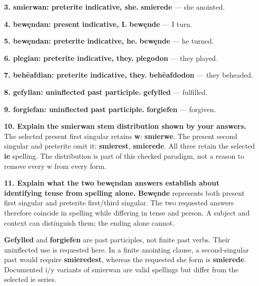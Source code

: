 \textbf{3. smierwan: preterite indicative, she.} \textbf{smierede} — she anointed.

\textbf{4. bewęndan: present indicative, I.} \textbf{bewęnde} — I turn.

\textbf{5. bewęndan: preterite indicative, he.} \textbf{bewęnde} — he turned.

\textbf{6. plegian: preterite indicative, they.} \textbf{plegodon} — they played.

\textbf{7. behēafdian: preterite indicative, they.} \textbf{behēafdodon} — they beheaded.

\textbf{8. gefyllan: uninflected past participle.} \textbf{gefylled} — fulfilled.

\textbf{9. forgiefan: uninflected past participle.} \textbf{forgiefen} — forgiven.

\textbf{10. Explain the smierwan stem distribution shown by your answers.} The selected present first singular retains \textbf{w}: \textbf{smierwe}. The present second singular and preterite omit it: \textbf{smierest}, \textbf{smierede}. All three retain the selected \textbf{ie} spelling. The distribution is part of this checked paradigm, not a reason to remove every w from every form.

\textbf{11. Explain what the two bewęndan answers establish about identifying tense from spelling alone.} \textbf{Bewęnde} represents both present first singular and preterite first/\allowbreak{}third singular. The two requested answers therefore coincide in spelling while differing in tense and person. A subject and context can distinguish them; the ending alone cannot.

\textbf{Gefylled} and \textbf{forgiefen} are past participles, not finite past verbs. Their uninflected use is requested here. In a finite anointing clause, a second-singular past would require \textbf{smieredest}, whereas the requested she form is \textbf{smierede}. Documented i/\allowbreak{}y variants of smierwan are valid spellings but differ from the selected ie series.

